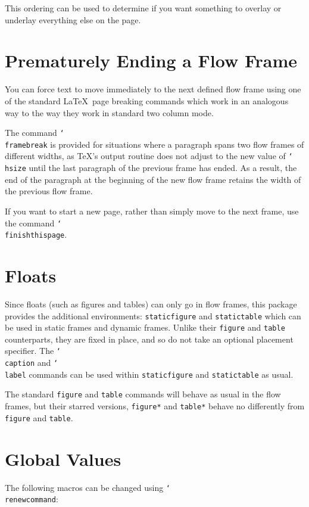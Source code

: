 \documentclass[a4paper,twoside]{report}
\newcommand{\cmdname}[1]{\texttt{\char`\\#1}}
\newcommand{\env}[1]{\texttt{#1}}
\begin{document}
This ordering can be used to determine if you want something
to overlay or underlay everything else on the page. 

\section{Prematurely Ending a Flow Frame}

You can force text to move immediately to the next defined
flow frame using one of the standard \LaTeX\ page breaking commands
which  work in an analogous way to the way they
work in standard two column mode. 

The command \cmdname{framebreak} is provided for situations
where a paragraph spans two flow frames
of different widths, as \TeX's output routine does not 
adjust to the new value of \cmdname{hsize} until the last 
paragraph of the previous frame has ended. As a 
result, the end of the paragraph at the beginning of the new
flow frame retains the width of the previous flow frame.

If you want to start a new page, rather than simply move to the 
next frame, use the command\newline
\cmdname{finishthispage}.

\section{Floats}

Since floats (such as figures and tables) can only go in 
{flow frames}, this package provides
the additional environments: 
\env{staticfigure} and  
\env{statictable} which can be used in static frames
and dynamic frames. Unlike their \env{figure} and
\env{table} counterparts, they are fixed in place, and
so do not take an optional placement specifier. The 
\cmdname{caption} and \cmdname{label} commands can 
be used within \env{staticfigure} and \env{statictable} as
usual.

The standard \env{figure} and \env{table} commands will 
behave as usual in the flow frames, but their starred versions,
\env{figure*} and \env{table*} behave no differently
from \env{figure} and \env{table}.

\section{Global Values}

The following macros can be changed using \cmdname{renewcommand}:
\end{document}
